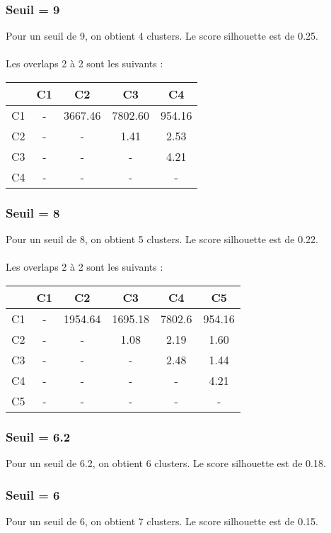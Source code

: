 \documentclass{article}
\begin{document}
\subsubsection*{Seuil = 9}

Pour un seuil de 9, on obtient 4 clusters. Le score silhouette est de 0.25.\\\\
Les overlaps 2 à 2 sont les suivants :\\

\begin{tabular}{|c|c|c|c|c|}
\hline
& C1 & C2 & C3 & C4 \\
\hline
C1 & - & 3667.46 & 7802.60 & 954.16 \\
\hline
C2 & - & - & 1.41 & 2.53 \\
\hline
C3 & - & - & - & 4.21 \\
\hline
C4 & - & - & - & - \\
\hline
\end{tabular}

\subsubsection*{Seuil = 8}
Pour un seuil de 8, on obtient 5 clusters. Le score silhouette est de 0.22.\\\\
Les overlaps 2 à 2 sont les suivants :\\

\begin{tabular}{|c|c|c|c|c|c|}
\hline
& C1 & C2 & C3 & C4 & C5 \\
\hline
C1 & - & 1954.64 & 1695.18 & 7802.6 & 954.16 \\
\hline
C2 & - & - & 1.08 & 2.19 & 1.60 \\
\hline
C3 & - & - & - & 2.48 & 1.44 \\
\hline
C4 & - & - & - & - & 4.21 \\
\hline
C5 & - & - & - & - & - \\
\hline
\end{tabular}

\subsubsection*{Seuil = 6.2}
Pour un seuil de 6.2, on obtient 6 clusters. Le score silhouette est de 0.18.

\subsubsection*{Seuil = 6}
Pour un seuil de 6, on obtient 7 clusters. Le score silhouette est de 0.15.
\end{document}
